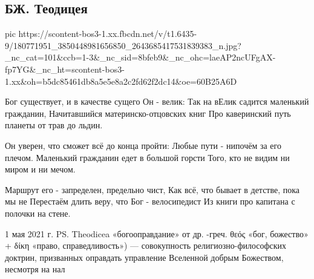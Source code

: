  
 
 
 
 
\subsection{БЖ. Теодицея}
\label{sec:01_05_2021.fb.bilchenko_evgenia.1.bog_velosipedist}


\ifcmt
  pic https://scontent-bos3-1.xx.fbcdn.net/v/t1.6435-9/180771951_3850448981656850_2643685417531839383_n.jpg?_nc_cat=101&ccb=1-3&_nc_sid=8bfeb9&_nc_ohc=laeAP2ncUFgAX-fp7YG&_nc_ht=scontent-bos3-1.xx&oh=b5dc85461db8a5e5e8a2c2fd62f2dc14&oe=60B25A6D
\fi


Бог существует, и в качестве сущего Он - велик:
Так на вЕлик садится маленький гражданин,
Начитавшийся материнско-отцовских книг
Про каверинский путь планеты от трав до льдин.

Он уверен, что сможет всё до конца пройти:
Любые пути - нипочём за его плечом.
Маленький гражданин едет в большой горсти
Того, кто не видим ни миром и ни мечом.

Маршрут его - запределен, предельно чист,
Как всё, что бывает в детстве, пока мы не
Перестаём длить веру, что Бог - велосипедист
Из книги про капитана с полочки на стене.

1 мая 2021 г.
PS. Theodicea «богооправдание» от др. -греч. θεός «бог, божество» + δίκη «право, справедливость») — совокупность религиозно-философских доктрин, призванных оправдать управление Вселенной добрым Божеством, несмотря на нал


